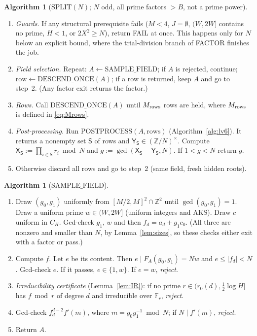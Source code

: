 \documentclass[11pt]{amsart}
\theoremstyle{definition}
\newtheorem{algorithm}[theorem]{Algorithm}
\newcommand{\Z}{\mathbb{Z}}
\newcommand{\F}{\mathbb{F}}
\newcommand{\sS}{\mathsf{S}}
\newcommand{\sX}{\mathsf{X}}
\newcommand{\sY}{\mathsf{Y}}
\begin{document}
\begin{algorithm}[$\mathrm{SPLIT}(N)$; $N$ odd, all prime factors $>B$, not a prime power]\label{alg:split}
\begin{enumerate}[label=\arabic*.]
\item[0.] \emph{Guards.} If any structural prerequisite fails ($M<4$, $J=\emptyset$, $(W,2W]$ contains no prime, $H<1$, or $2X^2\ge N$), return FAIL
  at once. This happens only for $N$ below an explicit bound, where the trial-division branch of FACTOR finishes the job.
\item \emph{Field selection.} Repeat: $A\leftarrow\mathrm{SAMPLE\_FIELD}$; if $A$ is rejected, continue;
  $\mathrm{row}\leftarrow\mathrm{DESCEND\_ONCE}(A)$; if a row is returned, keep $A$ and go to step~2.
  (Any factor exit returns the factor.)
\item \emph{Rows.} Call $\mathrm{DESCEND\_ONCE}(A)$ until $M_{\rm rows}$ rows are held, where $M_{\rm rows}$ is
  defined in \eqref{eq:Mrows}.
\item \emph{Post-processing.} Run $\mathrm{POSTPROCESS}(A,\text{rows})$ (Algorithm~\ref{alg:lv6}). It returns a nonempty set
  $\sS$ of rows and $\sY_\sS\in(\Z/N)^\times$. Compute $\sX_\sS:=\prod_{i\in\sS}r_i\bmod N$ and
  $g:=\gcd(\sX_\sS-\sY_\sS,N)$. If $1<g<N$ return $g$.
\item Otherwise discard all rows and go to step~2 (same field, fresh hidden roots).
\end{enumerate}
\end{algorithm}

\begin{algorithm}[$\mathrm{SAMPLE\_FIELD}$]\label{alg:field}
\begin{enumerate}[label=\arabic*.]
\item Draw $(g_0,g_1)$ uniformly from $[M/2,M]^2\cap\Z^2$ until $\gcd(g_0,g_1)=1$. Draw a uniform prime $w\in(W,2W]$
  (uniform integers and AKS). Draw $c$ uniform in $C_H$. Gcd-check $g_1$, $w$ and then $f_d=a_d+g_1c_0$. (All
  three are nonzero and smaller than $N$, by Lemma~\ref{lem:sizes}, so these checks either exit with a factor or pass.)
\item Compute $f$. Let $e$ be its content. Then $e\mid F_A(g_0,g_1)=Nw$ and $e\le|f_d|<N$. Gcd-check $e$. If it
  passes, $e\in\{1,w\}$. If $e=w$, \emph{reject}.
\item \emph{Irreducibility certificate} (Lemma~\ref{lem:IR}): if no prime $r\in(r_0(d),\tfrac12\log H]$ has $f\bmod r$ of degree $d$
  and irreducible over $\F_r$, \emph{reject}.
\item Gcd-check $f_d^{d-2}f'(m)$, where $m=g_0g_1^{-1}\bmod N$; if $N\mid f'(m)$, \emph{reject}.
\item Return $A$.
\end{enumerate}
\end{algorithm}
\end{document}
